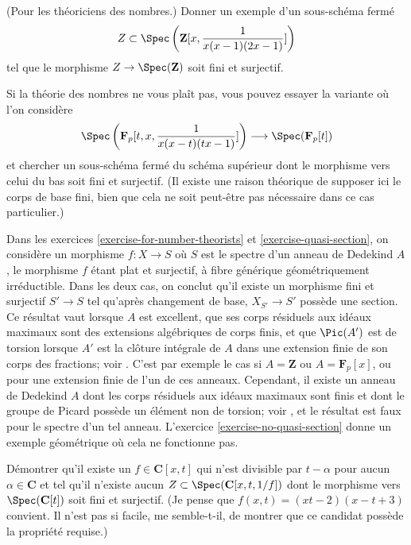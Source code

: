 \begin{exercise}
\label{exercise-for-number-theorists}
(Pour les théoriciens des nombres.) Donner un exemple d'un sous-schéma fermé
$$
Z \subset \Spec\left({\mathbf Z}[x, \frac{1 }{ x(x-1)(2x-1)}]\right)
$$
tel que le morphisme $Z \to \Spec({\mathbf Z})$ soit fini
et surjectif.
\end{exercise}

\begin{exercise}
\label{exercise-quasi-section}
Si la théorie des nombres ne vous plaît pas, vous pouvez essayer la
variante où l'on considère
$$
\Spec\left({\mathbf F}_p[t, x, \frac{1 }{ x(x-t)(tx-1)}]\right)
\longrightarrow
\Spec({\mathbf F}_p[t])
$$
et chercher un sous-schéma fermé du schéma supérieur
dont le morphisme vers celui du bas soit fini et surjectif. (Il existe une
raison théorique de supposer ici le corps de base fini, bien que
cela ne soit peut-être pas nécessaire dans ce cas particulier.)
\end{exercise}

\begin{remark}
\label{remark-interpretation-skolem-noether}
Dans les exercices \ref{exercise-for-number-theorists} et
\ref{exercise-quasi-section}, on considère un morphisme $f : X \to S$
où $S$ est le spectre d'un anneau de Dedekind $A$, le morphisme $f$ étant plat et
surjectif, à fibre générique géométriquement irréductible. Dans les deux cas,
on conclut qu'il existe un morphisme fini et surjectif $S' \to S$
tel qu'après changement de base, $X_{S'} \to S'$ possède une section.
Ce résultat vaut lorsque $A$ est excellent, que ses corps résiduels
aux idéaux maximaux sont des extensions algébriques de corps finis,
et que $\Pic(A')$ est de torsion lorsque $A'$ est la clôture intégrale
de $A$ dans une extension finie de son corps des fractions; voir \cite{MB1}.
C'est par exemple le cas si $A = \mathbf{Z}$ ou $A = \mathbf{F}_p[x]$, ou pour une extension
finie de l'un de ces anneaux. Cependant, il
existe un anneau de Dedekind $A$ dont les corps résiduels aux
idéaux maximaux sont finis et dont le groupe de Picard possède un élément non de torsion; voir \cite{Goldman},
et le résultat est faux pour le spectre d'un tel anneau.
L'exercice \ref{exercise-no-quasi-section} donne un exemple géométrique
où cela ne fonctionne pas.
\end{remark}

\begin{exercise}
\label{exercise-no-quasi-section}
Démontrer qu'il existe un $f \in \mathbf{C}[x, t]$ qui n'est divisible
par $t - \alpha$ pour aucun $\alpha \in \mathbf{C}$ et tel qu'il
n'existe aucun $Z \subset \Spec(\mathbf{C}[x, t, 1/f])$
dont le morphisme vers $\Spec(\mathbf{C}[t])$ soit fini et surjectif.
(Je pense que $f(x, t) = (xt - 2)(x - t + 3)$ convient. Il n'est pas si facile,
me semble-t-il, de montrer que ce candidat possède la propriété requise.)
\end{exercise}

